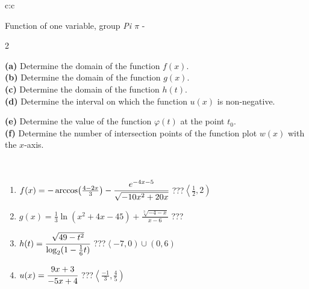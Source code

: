 \documentclass[10pt]{report}
\begin{document}
\begin{tabular}{c:c}
\begin{minipage}[c][104.5mm][t]{0.5\linewidth}
\begin{center}
\vspace{7mm}
{\huge Function of one variable, group \textit{Pi $\pi$} -}\\[5mm]
\begin{minipage}{0.95\linewidth}
\begin{center}
{\small \begin{multicols}{2} \raggedright
\textbf{(a)} Determine the domain of the function \(f(x)\). \\[1mm]
\textbf{(b)} Determine the domain of the function \(g(x)\). \\[1mm]
\textbf{(c)} Determine the domain of the function \(h(t)\). \\[1mm]
\textbf{(d)} Determine the interval on which the function \(u(x)\) is non-negative. \par \columnbreak
\textbf{(e)} Determine the value of the function \(\varphi(t)\) at the point \(t_0\). \\[1mm]
\textbf{(f)} Determine the number of intersection points of the function plot \(w(x)\) with the \(x\)-axis. \\[1mm]
\end{multicols}
}
\end{center}
\end{minipage}
\\[4mm]
\begin{minipage}{0.79\linewidth}
\begin{center}
\begin{varwidth}{\linewidth}
\begin{enumerate}
\small
\item $f(x) = -\arccos\!\left( \frac{4-2x}{3} \right) - \cfrac{e^{-4x-5}}{\sqrt{-10x^2+20x}}$\quad \dotfill\; ???\;\dotfill \quad $\left\langle\frac{1}{2} , 2\right)$
\item $g(x) = \frac{1}{3} \ln{\!(x^2+4x-45)}+\frac{\sqrt[3]{-4-x}}{x-6}$\quad \dotfill\; ???\;\dotfill {}
\item $h(t) = \cfrac{\sqrt{49-t^2}}{\log_2(1-\frac{1}{6}t)}$\quad \dotfill\; ???\;\dotfill \quad $\left\langle-7 , 0\right)\cup\left(0 , 6\right)$
\item $u(x) = \cfrac{9x+3}{-5x+4}$\quad \dotfill\; ???\;\dotfill \quad $\left\langle\frac{-1}{3} , \frac{4}{5}\right)$

\end{enumerate}
\end{varwidth}
\end{center}
\end{minipage}
\end{center}
\end{minipage}
\end{tabular}
\end{document}
